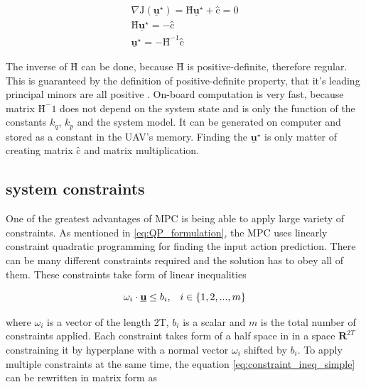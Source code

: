 \documentclass{article}
\begin{document}
\begin{equation}
\label{eq:J_local_min}
\begin{split}
\nabla\mathrm{J}(\underline{\textbf{u}}^{\star}) = \textbf{\^H}\underline{\textbf{u}}^{\star} + \textbf{\^c} = 0 \\
\textbf{\^H}\underline{\textbf{u}}^{\star} = - \textbf{\^c} \\
\underline{\textbf{u}}^{\star} = -\textbf{\^H}^{-1}\textbf{\^c}
\end{split}
\end{equation}

The inverse of $\textbf{\^H}$ can be done, because $\textbf{\^H}$ is positive-definite, therefore regular. This is guaranteed by the definition of positive-definite property, that it's leading principal minors are all positive \cite{chong2013introduction}. On-board computation is very fast, because matrix $\textbf{\^H}^-1$ does not depend on the system state and is only the function of the constants $k_q$, $k_p$ and the system model. It can be generated on computer and stored as a constant in the UAV's memory. Finding the $\underline{\textbf{u}}^{\star}$ is only matter of creating matrix $\textbf{\^c}$ and matrix multiplication.


\subsection{system constraints} \label{sec:system_constraints}
One of the greatest advantages of MPC is being able to apply large variety of constraints. As mentioned in \ref{eq:QP_formulation}, the MPC uses linearly constraint quadratic programming for finding the input action prediction. There can be many different constraints required and the solution has to obey all of them. These constraints take form of linear inequalities

\begin{equation}
\label{eq:constraint_ineq_simple}
\omega_i \cdot \textbf{\underline{u}} \leq b_i, \;\;\; i \in \{1, 2, ..., m\}
\end{equation}

where $\omega_i$ is a vector of the length 2T, $b_i$ is a scalar and $m$ is the total number of constraints applied. Each constraint takes form of a half space in in a space $\textbf{R}^{2T}$ constraining it by hyperplane with a normal vector $\omega_i$ shifted by $b_i$. To apply multiple constraints at the same time, the equation \ref{eq:constraint_ineq_simple} can be rewritten in matrix form as 
\end{document}
